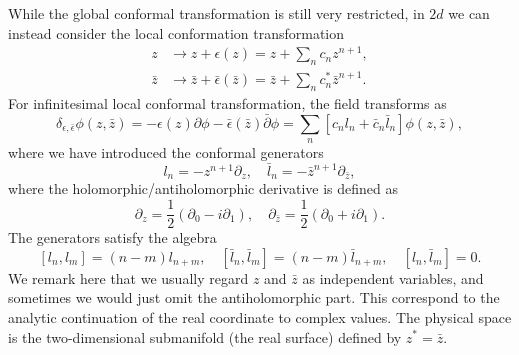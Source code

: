 \documentclass[aps,prb,superscriptaddress,nofootinbib]{revtex4}
\begin{document}
While the global conformal transformation is still very restricted, in $2d$ we can instead consider the local conformation transformation
\begin{equation}
\begin{aligned}
	z &\rightarrow z + \epsilon(z) = z + \sum_n c_n z^{n+1}, \\
	\bar z &\rightarrow \bar z + \bar\epsilon(\bar z) = \bar z + \sum_n c_n^* \bar z^{n+1}.
\end{aligned}
\end{equation}
For infinitesimal local conformal transformation, the field transforms as
\begin{equation}
	\delta_{\epsilon,\bar\epsilon} \phi(z,\bar z) = -\epsilon(z)\partial \phi - \bar\epsilon(\bar z)\bar\partial\phi = \sum_n \left[c_n l_n + \bar c_n \bar l_n \right] \phi(z,\bar z),
\end{equation}
where we have introduced the conformal generators
\begin{equation}
	l_n= -z^{n+1}\partial_z, \quad \bar l_n = -\bar z^{n+1} \partial_{\bar z},
\end{equation}
where the holomorphic/antiholomorphic derivative is defined as
\begin{equation}
	\partial_z = \frac{1}{2}(\partial_0 - i\partial_1),\quad
	\partial_{\bar z} = \frac{1}{2}(\partial_0 + i\partial_1).
\end{equation}
The generators satisfy the algebra
\begin{equation}
	\left[l_n , l_m\right] = (n-m) l_{n+m}, \quad
	\left[\bar l_n , \bar l_m\right] = (n-m) \bar l_{n+m}, \quad
	\left[l_n , \bar l_m\right] = 0.
\end{equation}
We remark here that we usually regard $z$ and $\bar z$ as independent variables, and sometimes we would just omit the antiholomorphic part. 
This correspond to the analytic continuation of the real coordinate to complex values.
The physical space is the two-dimensional submanifold (the real surface) defined by $z^* = \bar z$.
\end{document}
